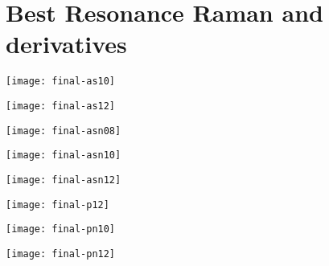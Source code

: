 \newpage
\section{Best Resonance Raman and derivatives}

\begin{figure*}[h]
    \texttt{[image: final-as10]}
    \caption[RR spectra of As10-STX at \SI{381}{\nano\metre}]{RR spectra of As10-STX at \SI{381}{\nano\metre}}
\end{figure*}
\begin{figure*}[h]
    \texttt{[image: final-as12]}
    \caption[RR spectra of As12-STX at \SI{543}{\nano\metre}]{RR spectra of As12-STX at \SI{543}{\nano\metre}}
\end{figure*}
\begin{figure*}[h]
    \texttt{[image: final-asn08]}
    \caption[RR spectra of AsN08-STX at \SI{498}{\nano\metre}]{RR spectra of AsN08-STX at \SI{498}{\nano\metre}}
\end{figure*}

\newpage

\begin{figure*}[h]
    \texttt{[image: final-asn10]}
    \caption[RR spectra of AsN10-STX at \SI{618}{\nano\metre}]{RR spectra of AsN10-STX at \SI{618}{\nano\metre}}
\end{figure*}
\begin{figure*}[h]
    \texttt{[image: final-asn12]}
    \caption[RR spectra of AsN12-STX at \SI{707}{\nano\metre}]{RR spectra of AsN12-STX at \SI{707}{\nano\metre}}
\end{figure*}
\begin{figure*}[h]
    \texttt{[image: final-p12]}
    \caption[RR spectra of P12-STX at \SI{447}{\nano\metre}]{RR spectra of P12-STX at \SI{447}{\nano\metre}}
\end{figure*}

\newpage

\begin{figure*}[h]
    \texttt{[image: final-pn10]}
    \caption[RR spectra of PN10-STX at \SI{525}{\nano\metre}]{RR spectra of PN10-STX at \SI{525}{\nano\metre}}
\end{figure*}
\begin{figure*}[h]
    \texttt{[image: final-pn12]}
    \caption[RR spectra of PN12-STX at \SI{616}{\nano\metre}]{RR spectra of PN12-STX at \SI{616}{\nano\metre}}
\end{figure*}
